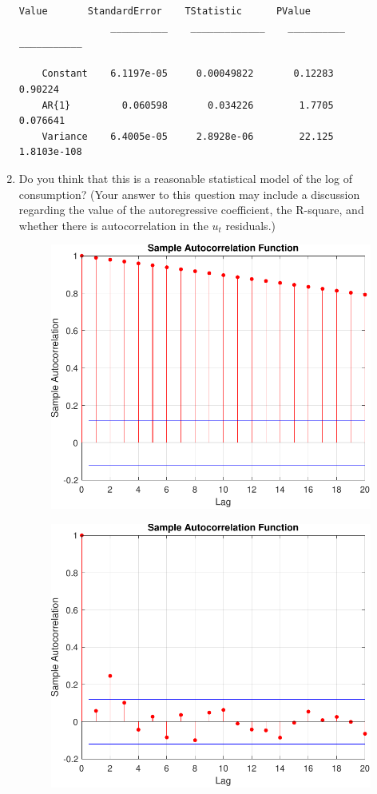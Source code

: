 \documentclass[11pt]{article}
\begin{document}
\begin{enumerate}
\begin{lstlisting}[caption={Matlab output from AR(1) model on residuals}, label=lst:resid-output]
                  Value       StandardError    TStatistic      PValue   
                __________    _____________    __________    ___________

    Constant    6.1197e-05     0.00049822       0.12283          0.90224
    AR{1}         0.060598       0.034226        1.7705         0.076641
    Variance    6.4005e-05     2.8928e-06        22.125      1.8103e-108
\end{lstlisting}

\newpage
\item  Do you think that this is a reasonable statistical model of the log of
consumption? (Your answer to this question may include a discussion regarding
the value of the autoregressive coefficient, the R-square, and whether there is
autocorrelation in the $u_t$ residuals.)

\begin{figure}[htp]
\centering
\begin{minipage}{.5\textwidth}
  \centering
  \includegraphics[width=.4\linewidth]{data-autocorrelation-plot.pdf}
  \label{fig:q4-data-autocorrplot}
\end{minipage}%
\begin{minipage}{.5\textwidth}
  \centering
  \includegraphics[width=.4\linewidth]{residual-autocorrelation-plot.pdf}
  \label{fig:q4-residual-autocorrplot}
\end{minipage}
\end{figure}


\end{enumerate}
\end{document}
